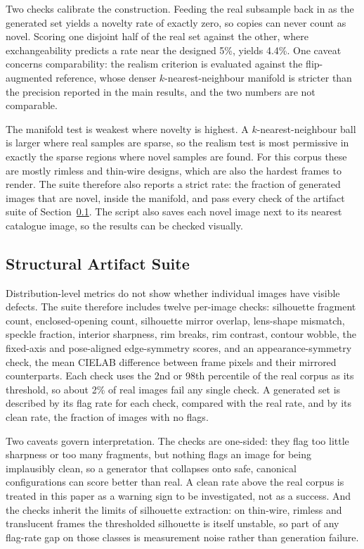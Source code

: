\documentclass[electronics,article,submit,pdftex,moreauthors]{Definitions/mdpi}
\begin{document}
Two checks calibrate the construction. Feeding the real subsample back in
as the generated set yields a novelty rate of exactly zero, so copies can
never count as novel. Scoring one disjoint half of the real set against
the other, where exchangeability predicts a rate near the designed 5\%, yields 4.4\%. One caveat concerns comparability: the realism
criterion is evaluated against the flip-augmented reference, whose denser
$k$-nearest-neighbour manifold is stricter than the precision reported in
the main results, and the two numbers are not comparable.

The manifold test is weakest where novelty is highest. A
$k$-nearest-neighbour ball is larger where real samples are sparse, so the
realism test is most permissive in exactly the sparse regions where novel
samples are found. For this corpus these are mostly rimless and thin-wire
designs, which are also the hardest frames to render. The suite therefore
also reports a strict rate: the fraction of generated images that are novel,
inside the manifold, and pass every check of the artifact suite of
Section~\ref{subsec:artifacts}. The script also saves each novel image next
to its nearest catalogue image, so the results can be checked visually.

\subsection{Structural Artifact Suite}
\label{subsec:artifacts}

Distribution-level metrics do not show whether individual images have
visible defects. The suite therefore includes twelve per-image checks: silhouette fragment count, enclosed-opening count, silhouette
mirror overlap, lens-shape mismatch, speckle fraction, interior sharpness,
rim breaks, rim contrast, contour wobble, the fixed-axis and pose-aligned
edge-symmetry scores, and an appearance-symmetry check, the mean CIELAB
difference between frame pixels and their mirrored counterparts. Each check uses the 2nd or 98th percentile of the real corpus as its
threshold, so about 2\% of real images fail any single check. A generated
set is described by its flag rate for each check, compared with the real
rate, and by its clean rate, the fraction of images with no flags.

Two caveats govern interpretation. The checks are one-sided: they flag
too little sharpness or too many fragments, but nothing flags an image
for being implausibly clean, so a generator that collapses onto safe,
canonical configurations can score better than real. A clean rate above
the real corpus is treated in this paper as a warning sign to be
investigated, not as a success. And the checks inherit the limits of
silhouette extraction: on thin-wire, rimless and translucent frames the
thresholded silhouette is itself unstable, so part of any flag-rate gap
on those classes is measurement noise rather than generation failure.
\end{document}
